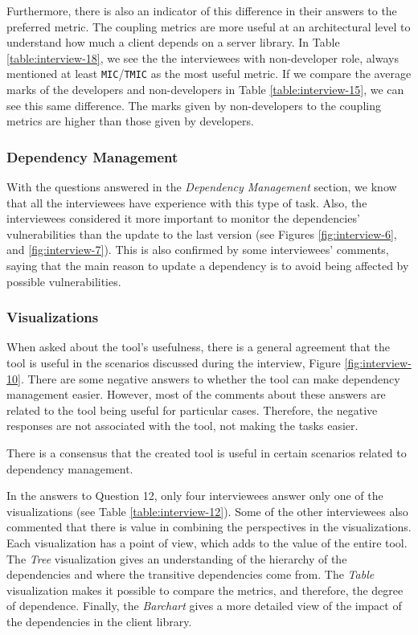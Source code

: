 Furthermore, there is also an indicator of this difference in their answers to the preferred metric. The coupling metrics are more useful at an architectural level to understand how much a client depends on a server library. In Table \ref{table:interview-18}, we see the the interviewees with non-developer role, always mentioned at least \texttt{MIC}/\texttt{TMIC} as the most useful metric. If we compare the average marks of the developers and non-developers in Table \ref{table:interview-15}, we can see this same difference. The marks given by non-developers to the coupling metrics are higher than those given by developers.

\subsubsection{Dependency Management}
With the questions answered in the \textit{Dependency Management} section, we know that all the interviewees have experience with this type of task. Also, the interviewees considered it more important to monitor the dependencies' vulnerabilities than the update to the last version (see Figures \ref{fig:interview-6}, and \ref{fig:interview-7}). This is also confirmed by some interviewees' comments, saying that the main reason to update a dependency is to avoid being affected by possible vulnerabilities.

\subsubsection{Visualizations}
When asked about the tool's usefulness, there is a general agreement that the tool is useful in the scenarios discussed during the interview, Figure \ref{fig:interview-10}. There are some negative answers to whether the tool can make dependency management easier. However, most of the comments about these answers are related to the tool being useful for particular cases. Therefore, the negative responses are not associated with the tool, not making the tasks easier.

\begin{finding}
	There is a consensus that the created tool is useful in certain scenarios related to dependency management.
	\label{find:tool-useful}
\end{finding}

In the answers to Question 12, only four interviewees answer only one of the visualizations (see Table \ref{table:interview-12}). Some of the other interviewees also commented that there is value in combining the perspectives in the visualizations. Each visualization has a point of view, which adds to the value of the entire tool. The \textit{Tree} visualization gives an understanding of the hierarchy of the dependencies and where the transitive dependencies come from. The \textit{Table} visualization makes it possible to compare the metrics, and therefore, the degree of dependence. Finally, the \textit{Barchart} gives a more detailed view of the impact of the dependencies in the client library.

